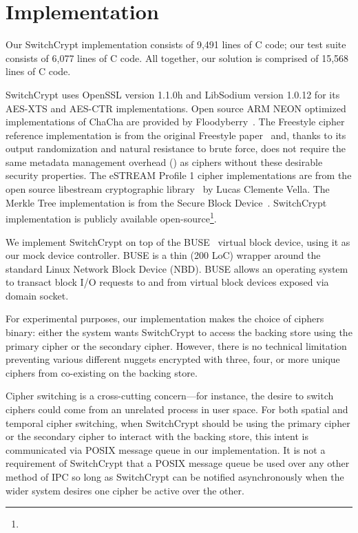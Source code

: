 \section{Implementation}\label{sec:implementation}

Our SwitchCrypt implementation consists of 9,491 lines of C code; our test suite
consists of 6,077 lines of C code. All together, our solution is comprised of
15,568 lines of C code. 

SwitchCrypt uses OpenSSL version 1.1.0h and LibSodium version 1.0.12 for its
AES-XTS and AES-CTR implementations. Open source ARM NEON optimized
implementations of ChaCha are provided by Floodyberry~\cite{Floodyberry}. The
Freestyle cipher reference implementation is from the original Freestyle
paper~\cite{Freestyle} and, thanks to its output randomization and natural
resistance to brute force, does not require the same metadata management
overhead ()
as ciphers without these desirable security properties. The eSTREAM Profile 1
cipher implementations are from the open source libestream cryptographic
library~\cite{libestream} by Lucas Clemente Vella. The Merkle Tree
implementation is from the Secure Block Device~\cite{SBD}. SwitchCrypt
implementation is publicly available open-source\footnote{\SystemURI}.

We implement SwitchCrypt on top of the BUSE~\cite{BUSE} virtual block device,
using it as our mock device controller. BUSE is a thin (200 LoC) wrapper around
the standard Linux Network Block Device (NBD). BUSE allows an operating system
to transact block I/O requests to and from virtual block devices exposed via
domain socket.

For experimental purposes, our implementation makes the choice of ciphers
binary: either the system wants SwitchCrypt to access the backing store using the
primary cipher or the secondary cipher. However, there is no technical
limitation preventing various different nuggets encrypted with three, four, or
more unique ciphers from co-existing on the backing store.

Cipher switching is a cross-cutting concern---for instance, the desire to switch
ciphers could come from an unrelated process in user space. For both spatial and
temporal cipher switching, when SwitchCrypt should be using the primary cipher or
the secondary cipher to interact with the backing store, this intent is
communicated via POSIX message queue in our implementation. It is not a
requirement of SwitchCrypt that a POSIX message queue be used over any other
method of IPC so long as SwitchCrypt can be notified asynchronously when the wider
system desires one cipher be active over the other.

